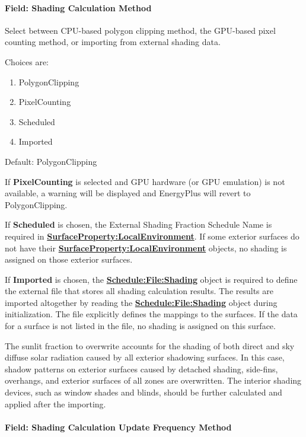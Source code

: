 \paragraph{Field: Shading Calculation Method}

Select between CPU-based polygon clipping method, the GPU-based pixel counting method, or importing from external shading data.

Choices are:
\begin{enumerate}
    \item PolygonClipping
    \item PixelCounting
    \item Scheduled
    \item Imported
\end{enumerate}

Default: PolygonClipping

If \textbf{PixelCounting} is selected and GPU hardware (or GPU emulation) is not available, a warning will be displayed and EnergyPlus will revert to PolygonClipping.

If \textbf{Scheduled} is chosen, the External Shading Fraction Schedule Name is required in \textbf{\hyperref[surfacePropertylocalEnvironment]{SurfaceProperty:LocalEnvironment}}. If some exterior surfaces do not have their \textbf{\hyperref[surfacePropertylocalEnvironment]{SurfaceProperty:LocalEnvironment}} objects, no shading is assigned on those exterior surfaces.

If \textbf{Imported} is chosen, the \textbf{\hyperref[schedulefileshading]{Schedule:File:Shading}} object is required to define the external file that stores all shading calculation results. The results are imported altogether by reading the \textbf{\hyperref[schedulefileshading]{Schedule:File:Shading}} object during initialization. The file explicitly defines the mappings to the surfaces. If the data for a surface is not listed in the file, no shading is assigned on this surface.

The sunlit fraction to overwrite accounts for the shading of both direct and sky diffuse solar radiation caused by all exterior shadowing surfaces. In this case, shadow patterns on exterior surfaces caused by detached shading, side-fins, overhangs, and exterior surfaces of all zones are overwritten. The interior shading devices, such as window shades and blinds, should be further calculated and applied after the importing.

\paragraph{Field: Shading Calculation Update Frequency Method}\label{field-calculation-method-000}

